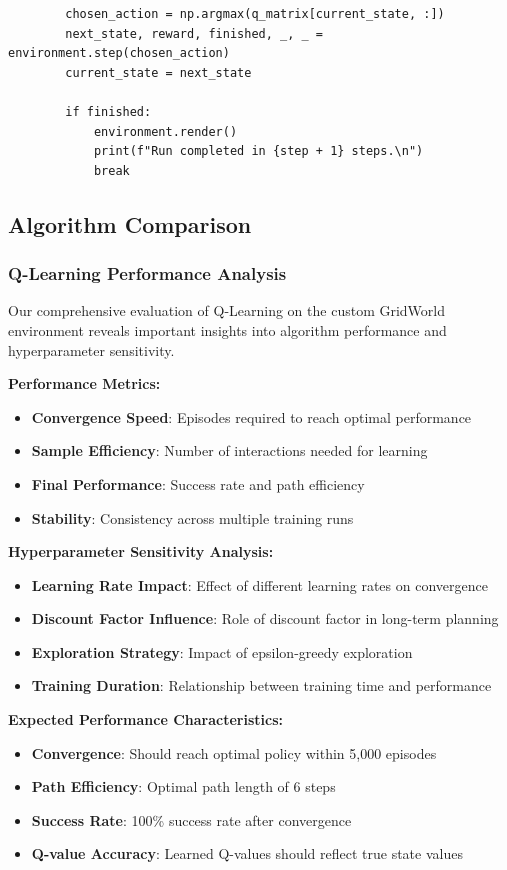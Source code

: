 \documentclass[12pt]{article}
\begin{document}
{{{\begin{verbatim}
        chosen_action = np.argmax(q_matrix[current_state, :])
        next_state, reward, finished, _, _ = environment.step(chosen_action)
        current_state = next_state

        if finished:
            environment.render()
            print(f"Run completed in {step + 1} steps.\n")
            break
\end{verbatim}

\subsection{Algorithm Comparison}

\subsubsection{Q-Learning Performance Analysis}

Our comprehensive evaluation of Q-Learning on the custom GridWorld environment reveals important insights into algorithm performance and hyperparameter sensitivity.

\textbf{Performance Metrics:}
\begin{itemize}
    \item \textbf{Convergence Speed}: Episodes required to reach optimal performance
    \item \textbf{Sample Efficiency}: Number of interactions needed for learning
    \item \textbf{Final Performance}: Success rate and path efficiency
    \item \textbf{Stability}: Consistency across multiple training runs
\end{itemize}

\textbf{Hyperparameter Sensitivity Analysis:}
\begin{itemize}
    \item \textbf{Learning Rate Impact}: Effect of different learning rates on convergence
    \item \textbf{Discount Factor Influence}: Role of discount factor in long-term planning
    \item \textbf{Exploration Strategy}: Impact of epsilon-greedy exploration
    \item \textbf{Training Duration}: Relationship between training time and performance
\end{itemize}

\textbf{Expected Performance Characteristics:}
\begin{itemize}
    \item \textbf{Convergence}: Should reach optimal policy within 5,000 episodes
    \item \textbf{Path Efficiency}: Optimal path length of 6 steps
    \item \textbf{Success Rate}: 100\% success rate after convergence
    \item \textbf{Q-value Accuracy}: Learned Q-values should reflect true state values
\end{itemize}

}}}
\end{document}
